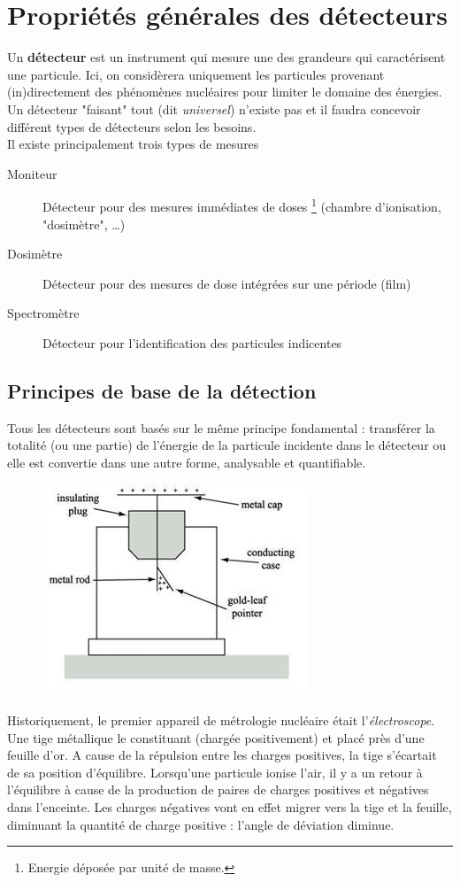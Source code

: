 \chapter{Propriétés générales des détecteurs}
Un \textbf{détecteur} est un instrument qui mesure une des grandeurs qui caractérisent une particule.
Ici, on considèrera uniquement les particules provenant (in)directement des phénomènes nucléaires 
pour limiter le domaine des énergies. Un détecteur "faisant" tout (dit \textit{universel}) n'existe 
pas et il faudra concevoir différent types de détecteurs selon les besoins.\\

Il existe principalement trois types de mesures 
\begin{description}
\item[Moniteur] Détecteur pour des mesures immédiates de doses
\footnote{Energie déposée par unité de masse.} 
(chambre d'ionisation, "dosimètre", \dots )
\item[Dosimètre] Détecteur pour des mesures de dose intégrées sur
une période (film)
\item[Spectromètre]Détecteur pour l'identification des particules
indicentes
\end{description}

\section{Principes de base de la détection}%
Tous les détecteurs sont basés sur le même principe fondamental : 
transférer la totalité (ou une partie) de l'énergie de la particule
incidente dans le détecteur ou elle est convertie dans une autre
forme, analysable et quantifiable. \\

	\begin{figure}
	\vspace{-5mm}
	\includegraphics[scale=0.5]{ch7/image1}
	\end{figure}
Historiquement, le premier appareil de métrologie nucléaire était 
l'\textit{électroscope}. Une tige métallique le constituant 
(chargée positivement) et placé près d'une feuille d'or. A cause de 
la répulsion entre les charges positives, la tige s'écartait de 
sa position d'équilibre. Lorsqu'une particule ionise l'air, il y
a un retour à l'équilibre à cause de la production de paires de
charges positives et négatives dans l'enceinte. Les charges
négatives vont en effet migrer vers la tige et la feuille, 
diminuant la quantité de charge positive : l'angle de déviation 
diminue.\\

